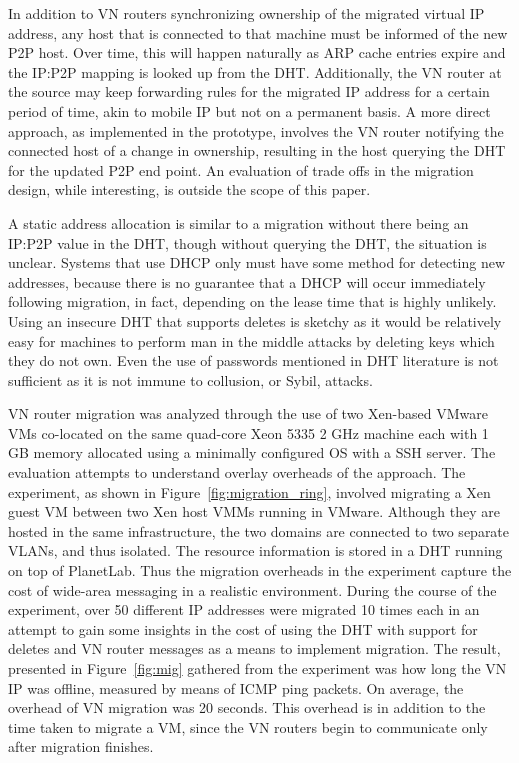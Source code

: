 In addition to VN routers synchronizing ownership of the migrated virtual
IP address, any host that is connected to that machine must be informed
of the new P2P host.  Over time, this will happen naturally as ARP cache
entries expire and the IP:P2P mapping is looked up from the DHT.  Additionally,
the VN router at the source may keep forwarding rules for the migrated IP
address for a certain period of time, akin to mobile IP but not on a permanent
basis.  A more direct approach, as implemented in the prototype, involves the VN
router notifying the connected host of a change in ownership, resulting in the
host querying the DHT for the updated P2P end point.  An evaluation of trade offs
in the migration design, while interesting, is outside the scope of this paper. 

A static address allocation is similar to a migration without there being an
IP:P2P value in the DHT, though without querying the DHT, the situation is
unclear.  Systems that use DHCP only must have some method for detecting new
addresses, because there is no guarantee that a DHCP will occur immediately
following migration, in fact, depending on the lease time that is highly
unlikely.  Using an insecure DHT that supports deletes is sketchy as it would
be relatively easy for machines to perform man in the middle attacks by
deleting keys which they do not own.  Even the use of passwords mentioned in
DHT literature is not sufficient as it is not immune to collusion, or Sybil,
attacks.

VN router migration was analyzed through the use of two Xen-based VMware VMs
co-located on the same quad-core Xeon 5335 2 GHz machine each with 1 GB memory
allocated using a minimally configured OS with a SSH server.  The evaluation
attempts to understand overlay overheads of the approach.  The experiment, as
shown in Figure~\ref{fig:migration_ring}, involved migrating a Xen guest VM
between two Xen host VMMs running in VMware.  Although they are hosted in the
same infrastructure, the two domains are connected to two separate VLANs, and
thus isolated.  The resource information is stored in a DHT running on top of
PlanetLab.  Thus the migration overheads in the experiment capture the cost of
wide-area messaging in a realistic environment.  During the course of the
experiment, over 50 different IP addresses were migrated 10 times each in an
attempt to gain some insights in the cost of using the DHT with support for
deletes and VN router messages as a means to implement migration.  The result,
presented in Figure~\ref{fig:mig} gathered from the experiment was how long the
VN IP was offline, measured by means of ICMP ping packets.  On average, the
overhead of VN migration was 20 seconds. This overhead is in addition to the
time taken to migrate a VM, since the VN routers begin to communicate only
after migration finishes. 

